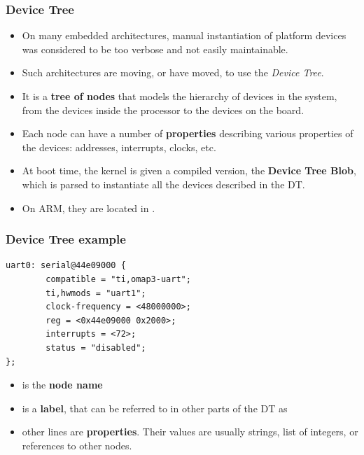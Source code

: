 \begin{frame}
  \frametitle{Device Tree}
  \begin{itemize}
  \item On many embedded architectures, manual instantiation of
    platform devices was considered to be too verbose and not easily
    maintainable.
  \item Such architectures are moving, or have moved, to use the {\em
      Device Tree}.
  \item It is a {\bf tree of nodes} that models the hierarchy of
    devices in the system, from the devices inside the processor to
    the devices on the board.
  \item Each node can have a number of {\bf properties} describing
    various properties of the devices: addresses, interrupts, clocks,
    etc.
  \item At boot time, the kernel is given a compiled version, the {\bf
      Device Tree Blob}, which is parsed to instantiate all the
    devices described in the DT.
  \item On ARM, they are located in .
  \end{itemize}
\end{frame}

\begin{frame}[fragile]
  \frametitle{Device Tree example}
  \begin{block}{}
\begin{verbatim}
uart0: serial@44e09000 {
        compatible = "ti,omap3-uart";
        ti,hwmods = "uart1";
        clock-frequency = <48000000>;
        reg = <0x44e09000 0x2000>;
        interrupts = <72>;
        status = "disabled";
};
  \end{verbatim}
  \end{block}
  \normalsize
  \begin{itemize}
  \item {} is the {\bf node name}
  \item {} is a {\bf label}, that can be referred to in other
    parts of the DT as 
  \item other lines are {\bf properties}. Their values are usually
    strings, list of integers, or references to other nodes.
  \end{itemize}
\end{frame}

